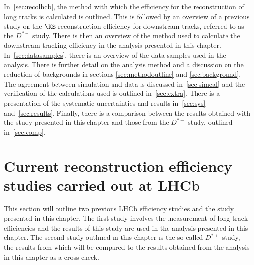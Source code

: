 

 




In~\autoref{sec:recolhcb}, the method with which the efficiency for the reconstruction of long tracks is calculated is outlined. This is followed by an overview of a previous study on the $\KS$ reconstruction efficiency for downstream tracks, referred to as the $D^{*+}$ study. There is then an overview of the method used to calculate the downstream tracking efficiency in the analysis presented in this chapter. In~\autoref{sec:datasamples}, there is an overview of the data samples used in the analysis. There is further detail on the analysis method and a discussion on the reduction of backgrounds in sections \ref{sec:methodoutline} and \ref{sec:background}. The agreement between simulation and data is discussed in~\autoref{sec:simcal} and the verification of the calculations used is outlined in~\autoref{sec:extra}. There is a presentation of the systematic uncertainties and results in~\autoref{sec:sys} and~\autoref{sec:results}. Finally, there is a comparison between the results obtained with the study presented in this chapter and those from the $D^{*+}$ study, outlined in~\autoref{sec:comp}. %

\section{Current reconstruction efficiency studies carried out at LHCb}
\label{sec:recolhcb}
This section will outline two previous LHCb efficiency studies and the study presented in this chapter. The first study involves the measurement of long track efficiencies and the results of this study are used in the analysis presented in this chapter.  The second study outlined in this chapter is the so-called $D^{*+}$ study, the results from which will be compared to the results obtained from the analysis in this chapter as a cross check. %

